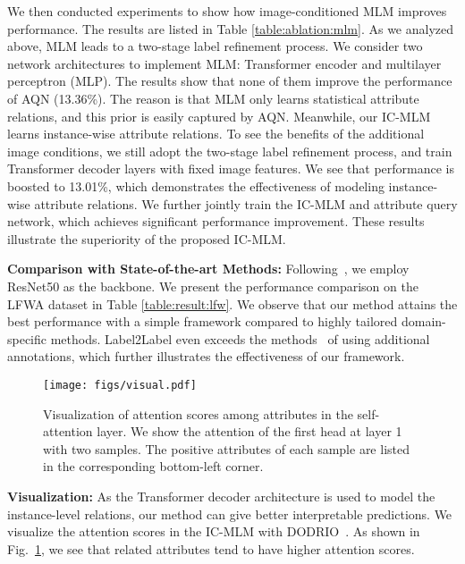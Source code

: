 \documentclass[runningheads]{llncs}
\begin{document}
We then conducted experiments to show how image-conditioned MLM improves performance. The results are listed in Table \ref{table:ablation:mlm}. As we analyzed above, MLM leads to a two-stage label refinement process. We consider two network architectures to implement MLM: Transformer encoder and multilayer perceptron (MLP). The results show that none of them improve the performance of AQN (13.36\%). The reason is that MLM only learns statistical attribute relations, and this prior is easily captured by AQN. Meanwhile, our IC-MLM learns instance-wise attribute relations. To see the benefits of the additional image conditions, we still adopt the two-stage label refinement process, and train Transformer decoder layers with fixed image features. 
We see that performance is boosted to 13.01\%, which demonstrates the effectiveness of modeling instance-wise attribute relations. We further jointly train the IC-MLM and attribute query network, which achieves significant performance improvement. These results illustrate the superiority of the proposed IC-MLM.





\textbf{Comparison with State-of-the-art Methods:} Following~\cite{shu2021learning}, we employ ResNet50 as the backbone. We present the performance comparison on the LFWA dataset in Table \ref{table:result:lfw}. We observe that our method attains the best performance with a simple framework compared to highly tailored domain-specific methods. Label2Label even exceeds the methods~\cite{kalayeh2017improving,cao2018partially} of using additional annotations, which further illustrates the effectiveness of our framework.


\begin{figure}[t]
\begin{center}
   \texttt{[image: figs/visual.pdf]}
\end{center}
   \caption{Visualization of attention scores among attributes in the self-attention layer. We show the attention of the first head at layer 1 with two samples. The positive attributes of each sample are listed in the corresponding bottom-left corner. 
}
\label{fig:visual}
\end{figure}

\textbf{Visualization:} As the Transformer decoder architecture is used to model the instance-level relations, our method can give better interpretable predictions. We visualize the attention scores in the IC-MLM with DODRIO~\cite{wang2021dodrio}. As shown in Fig.~\ref{fig:visual}, we see that related attributes tend to have higher attention scores.
\end{document}
